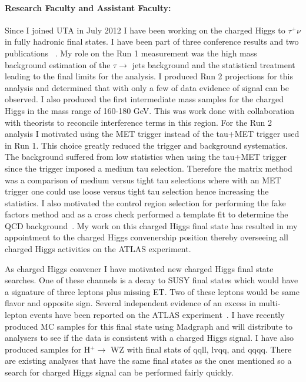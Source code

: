 \paragraph{Research Faculty and Assistant Faculty:}Since I joined UTA in July 2012 I have been working on the charged Higgs to $\tau^+\nu$ in fully hadronic final states.  I have been part of three conference results and two publications ~\cite{hptnu,atl2014,taunu,hptnu1}.
My role on the Run 1 measurement was the high mass background estimation of the $\tau \rightarrow$ jets background and the statistical treatment leading to the final 
limits for the analysis.  I produced Run 2 projections for this analysis and determined that with only a few \invfb of data evidence of signal can be observed.
I also produced the first intermediate mass samples for the charged Higgs in the mass range of 160-180 GeV.  This was work done with collaboration with theorists to reconcile interference terms in this region. 
For the Run 2 analysis I motivated using the MET trigger instead of the tau+MET trigger used in Run 1.  This choice greatly reduced the trigger and background systematics.  
The background suffered from low statistics when using the tau+MET trigger since the trigger imposed a medium tau selection.  Therefore the matrix method was a comparison
of medium versus tight tau selections where with an MET trigger one could use loose versus tight tau selection hence increasing the statistics.  I also motivated the control region selection
for performing the fake factors method and as a cross check performed a template fit to determine the QCD background~\cite{taunu,hptnu1}.
My work on this charged Higgs final state has resulted in my appointment to the charged Higgs convenership position thereby overseeing all charged Higgs activities on the ATLAS experiment.  

As charged Higgs convener I have motivated new charged Higgs final state searches.  One of these channels is a decay to SUSY final states which would have a signature of three leptons plus missing ET.  Two
of these leptons would be same flavor and opposite sign.  Several independent evidence of an excess in multi-lepton events have been reported on the ATLAS experiment~\cite{3lep}.  I have recently produced MC samples for this final state
using Madgraph and will distribute to analysers to see if the data is consistent with a charged Higgs signal. I have also produced samples for H$^+ \rightarrow$ WZ with final stats of qqll, lvqq, and qqqq.  There are existing analyses that have the same final states as the ones mentioned so a search for charged Higgs signal can be performed fairly quickly.

